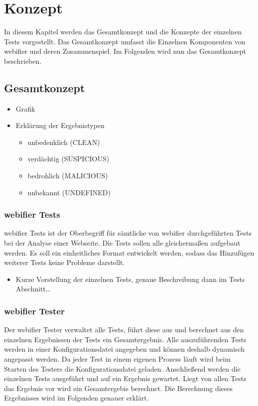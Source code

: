 \chapter{Konzept}

In diesem Kapitel werden das Gesamtkonzept und die Konzepte der einzelnen Tests vorgestellt. Das Gesamtkonzept umfasst die Einzelnen Komponenten von webifier und deren Zusammenspiel. Im Folgenden wird nun das Gesamtkonzept beschrieben.

\section{Gesamtkonzept}


\begin{itemize}
  \item Grafik
  \item Erklärung der Ergebnistypen
  \begin{itemize}
    \item unbedenklich (CLEAN)
    \item verdächtig (SUSPICIOUS)
    \item bedrohlich (MALICIOUS)
    \item unbekannt (UNDEFINED)
  \end{itemize}
\end{itemize}

\subsection{webifier Tests}

webifier Tests ist der Oberbegriff für sämtliche von webifier durchgeführten Tests bei der Analyse einer Webseite. Die Tests sollen alle gleichermaßen aufgebaut werden. Es soll ein einheitliches Format entwickelt werden, sodass das Hinzufügen weiterer Tests keine Probleme darstellt.

\begin{itemize}
  \item Kurze Vorstellung der einzelnen Tests, genaue Beschreibung dann im Tests Abschnitt\ldots
\end{itemize}

\subsection{webifier Tester}

Der webifier Tester verwaltet alle Tests, führt diese aus und berechnet aus den einzelnen Ergebnissen der Tests ein Gesamtergebnis. Alle auszuführenden Tests werden in einer Konfigurationsdatei angegeben und können deshalb dynamisch angepasst werden. Da jeder Test in einem eigenen Prozess läuft wird beim Starten des Testers die Konfigurationsdatei geladen. Anschließend werden die einzelnen Tests ausgeführt und auf ein Ergebnis gewartet. Liegt von allen Tests das Ergebnis vor wird ein Gesamtergebis berechnet. Die Berechnung dieses Ergebnisses wird im Folgenden genauer erklärt.

